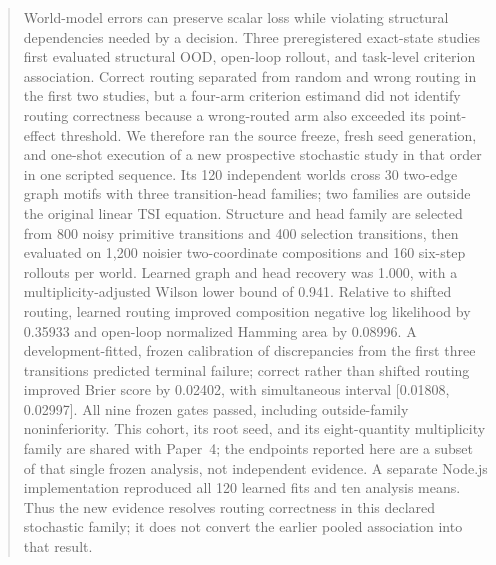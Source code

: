 \begin{abstract}
World-model errors can preserve scalar loss while violating structural
dependencies needed by a decision.  Three preregistered exact-state studies
first evaluated structural OOD, open-loop rollout, and task-level criterion
association.  Correct routing separated from random and wrong routing in the
first two studies, but a four-arm criterion estimand did not identify routing
correctness because a wrong-routed arm also exceeded its point-effect
threshold.  We therefore ran the source freeze, fresh seed generation, and
one-shot execution of a new prospective stochastic study in that order in one
scripted sequence.  Its 120 independent worlds cross 30
two-edge graph motifs with three transition-head families; two families are
outside the original linear TSI equation.  Structure and head family are
selected from 800 noisy primitive transitions and 400 selection transitions,
then evaluated on 1,200 noisier two-coordinate compositions and 160 six-step
rollouts per world.  Learned graph and head recovery was 1.000, with a
multiplicity-adjusted Wilson lower bound of 0.941.  Relative to shifted routing,
learned routing improved composition negative log likelihood by 0.35933 and
open-loop normalized Hamming area by 0.08996.  A development-fitted, frozen
calibration of discrepancies from the first three transitions predicted
terminal failure; correct rather than shifted routing improved Brier score by
0.02402, with simultaneous interval [0.01808, 0.02997].  All nine frozen gates
passed, including outside-family noninferiority.  This cohort, its root seed,
and its eight-quantity multiplicity family are shared with Paper~4; the endpoints
reported here are a subset of that single frozen analysis, not independent
evidence.  A separate Node.js
implementation reproduced all 120 learned fits and ten analysis means.  Thus
the new evidence resolves routing correctness in this declared stochastic
family; it does not convert the earlier pooled association into that result.
\end{abstract}
